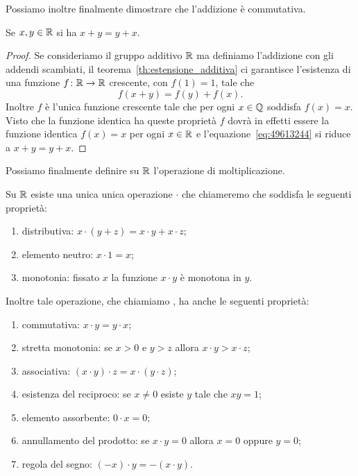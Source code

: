 Possiamo inoltre finalmente dimostrare che l'addizione è commutativa.
\begin{theorem}
  Se $x,y\in {\mathbb R}$ si ha $x+y=y+x$.
\end{theorem}
%
\begin{proof}
Se consideriamo il gruppo additivo ${\mathbb R}$ ma definiamo 
l'addizione con gli addendi scambiati, il teorema~\ref{th:estensione_additiva}
ci garantisce l'esistenza di 
una funzione $f\colon {\mathbb R}\to {\mathbb R}$ crescente, con $f(1)=1$, tale che 
\begin{equation}\label{eq:49613244}
  f(x+y) = f(y)+f(x).
\end{equation}
Inoltre $f$ è l'unica funzione crescente tale che 
per ogni $x\in {\mathbb Q}$ soddisfa $f(x)=x$. 
Visto che la funzione identica ha queste proprietà 
$f$ dovrà in effetti essere la funzione identica $f(x)=x$ 
per ogni $x\in {\mathbb R}$ 
e l'equazione~\eqref{eq:49613244} si riduce a $x+y=y+x$.
\end{proof}
%
Possiamo finalmente definire su ${\mathbb R}$ l'operazione di moltiplicazione.
%
\begin{theorem}[moltiplicazione]
Su ${\mathbb R}$ esiste una unica unica operazione $\cdot$ che chiameremo 
 che soddisfa le seguenti 
proprietà: 
\begin{enumerate}
  \item distributiva: $x\cdot(y+z) = x\cdot y + x\cdot z$;
  \item elemento neutro: $x\cdot 1 = x$;
  \item monotonia: fissato $x$ la funzione $x\cdot y$ è monotona in $y$.  
\end{enumerate}
  Inoltre tale operazione, che chiamiamo ,
  ha anche le seguenti proprietà:
\begin{enumerate}
  \item commutativa: $x\cdot y = y\cdot x$;
  \item stretta monotonia: se $x>0$ e $y>z$ allora $x\cdot y > x \cdot z$;
  \item associativa: $(x\cdot y)\cdot z = x \cdot (y\cdot z)$;
  \item esistenza del reciproco: se $x\neq 0$ esiste $y$ tale 
  che $xy = 1$;
  \item elemento assorbente: $0\cdot x = 0$;
  \item annullamento del prodotto: se $x\cdot y=0$ allora $x=0$ oppure $y=0$;
  \item regola del segno: $(-x)\cdot y = -(x\cdot y)$.
\end{enumerate}
\end{theorem}

